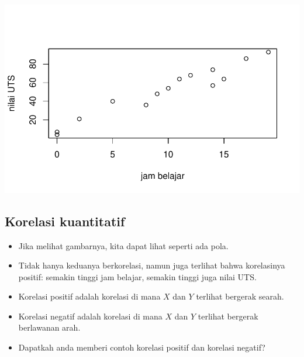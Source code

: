 \documentclass[
  letterpaper,
  DIV=11,
  numbers=noendperiod]{scrartcl}
\newenvironment{Shaded}{\begin{snugshade}}{\end{snugshade}}
\newcommand{\AttributeTok}[1]{\textcolor[rgb]{0.40,0.45,0.13}{#1}}
\newcommand{\FunctionTok}[1]{\textcolor[rgb]{0.28,0.35,0.67}{#1}}
\newcommand{\NormalTok}[1]{\textcolor[rgb]{0.00,0.23,0.31}{#1}}
\newcommand{\OtherTok}[1]{\textcolor[rgb]{0.00,0.23,0.31}{#1}}
\newcommand{\SpecialCharTok}[1]{\textcolor[rgb]{0.37,0.37,0.37}{#1}}
\newcommand{\StringTok}[1]{\textcolor[rgb]{0.13,0.47,0.30}{#1}}
\begin{document}
\begin{Shaded}
\end{Shaded}

\includegraphics{index_files/figure-pdf/unnamed-chunk-20-1.pdf}

\subsection{Korelasi kuantitatif}\label{korelasi-kuantitatif-4}

\begin{itemize}
\item
  Jika melihat gambarnya, kita dapat lihat seperti ada pola.
\item
  Tidak hanya keduanya berkorelasi, namun juga terlihat bahwa
  korelasinya positif: semakin tinggi jam belajar, semakin tinggi juga
  nilai UTS.
\item
  Korelasi positif adalah korelasi di mana \(X\) dan \(Y\) terlihat
  bergerak searah.
\item
  Korelasi negatif adalah korelasi di mana \(X\) dan \(Y\) terlihat
  bergerak berlawanan arah.
\item
  Dapatkah anda memberi contoh korelasi positif dan korelasi negatif?
\end{itemize}
\end{document}
